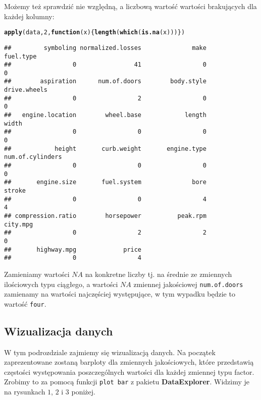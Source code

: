 \documentclass[12pt, a4paper]{article}\usepackage[]{graphicx}\usepackage[]{xcolor}
\makeatletter
\newcommand{\hlnum}[1]{\textcolor[rgb]{0.686,0.059,0.569}{#1}}%
\newcommand{\hlstd}[1]{\textcolor[rgb]{0.345,0.345,0.345}{#1}}%
\newcommand{\hlkwa}[1]{\textcolor[rgb]{0.161,0.373,0.58}{\textbf{#1}}}%
\newcommand{\hlkwc}[1]{\textcolor[rgb]{0.333,0.667,0.333}{#1}}%
\newcommand{\hlkwd}[1]{\textcolor[rgb]{0.737,0.353,0.396}{\textbf{#1}}}%
\newenvironment{kframe}{%
 \def\at@end@of@kframe{}%
 \ifinner\ifhmode%
  \def\at@end@of@kframe{\end{minipage}}%
  \begin{minipage}{\columnwidth}%
 \fi\fi%
 \def\FrameCommand##1{\hskip\@totalleftmargin \hskip-\fboxsep
 \colorbox{shadecolor}{##1}\hskip-\fboxsep
     \hskip-\linewidth \hskip-\@totalleftmargin \hskip\columnwidth}%
 \MakeFramed {\advance\hsize-\width
   \@totalleftmargin\z@ \linewidth\hsize
   \@setminipage}}%
 {\par\unskip\endMakeFramed%
 \at@end@of@kframe}
\newenvironment{knitrout}{}{} %
\makeatother
\begin{document}
Możemy też sprawdzić nie względną, a liczbową wartość wartości brakujących dla każdej kolumny:
\begin{knitrout}
\color{fgcolor}\begin{kframe}
\begin{alltt}
\hlkwd{apply}\hlstd{(data,}\hlnum{2}\hlstd{,}\hlkwa{function}\hlstd{(}\hlkwc{x}\hlstd{)\{}\hlkwd{length}\hlstd{(}\hlkwd{which}\hlstd{(}\hlkwd{is.na}\hlstd{(x)))\})}
\end{alltt}
\begin{verbatim}
##         symboling normalized.losses              make         fuel.type 
##                 0                41                 0                 0 
##        aspiration      num.of.doors        body.style      drive.wheels 
##                 0                 2                 0                 0 
##   engine.location        wheel.base            length             width 
##                 0                 0                 0                 0 
##            height       curb.weight       engine.type  num.of.cylinders 
##                 0                 0                 0                 0 
##       engine.size       fuel.system              bore            stroke 
##                 0                 0                 4                 4 
## compression.ratio        horsepower          peak.rpm          city.mpg 
##                 0                 2                 2                 0 
##       highway.mpg             price 
##                 0                 4
\end{verbatim}
\end{kframe}
\end{knitrout}
Zamieniamy wartości $NA$ na konkretne liczby tj. na średnie ze zmiennych ilościowych typu ciągłego, a wartości $NA$ zmiennej jakościowej \texttt{num.of.doors} zamienamy na wartości najczęściej występujące, w tym wypadku będzie to wartość \texttt{four}.


\subsection{Wizualizacja danych}

W tym podrozdziale zajmiemy się wizualizacją danych. Na początek zaprezentowane zostaną barploty dla zmiennych jakościowych, które przedstawią częstości występowania poszczególnych wartości dla każdej zmiennej typu factor. Zrobimy to za pomocą funkcji \texttt{plot bar} z pakietu \textbf{DataExplorer}. Widzimy je na rysunkach $1$, $2$ i $3$ poniżej.
\end{document}
